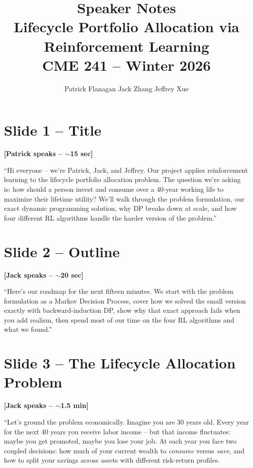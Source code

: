 \documentclass[11pt, letterpaper]{article}
\title{\textbf{Speaker Notes}\\[0.3em]
\large Lifecycle Portfolio Allocation via Reinforcement Learning\\
CME 241 -- Winter 2026}
\author{Patrick Flanagan \quad Jack Zhang \quad Jeffrey Xue}
\date{}
\begin{document}
\maketitle
\tableofcontents
\newpage

\section{Slide 1 -- Title}

\textbf{[Patrick speaks -- $\sim$15 sec]}

``Hi everyone -- we're Patrick, Jack, and Jeffrey. Our project applies reinforcement learning to the lifecycle portfolio allocation problem. The question we're asking is: how should a person invest and consume over a 40-year working life to maximize their lifetime utility? We'll walk through the problem formulation, our exact dynamic programming solution, why DP breaks down at scale, and how four different RL algorithms handle the harder version of the problem.''

\section{Slide 2 -- Outline}

\textbf{[Jack speaks -- $\sim$20 sec]}

``Here's our roadmap for the next fifteen minutes. We start with the problem formulation as a Markov Decision Process, cover how we solved the small version exactly with backward-induction DP, show why that exact approach fails when you add realism, then spend most of our time on the four RL algorithms and what we found.''

\section{Slide 3 -- The Lifecycle Allocation Problem}

\textbf{[Jack speaks -- $\sim$1.5 min]}

``Let's ground the problem economically. Imagine you are 30 years old. Every year for the next 40 years you receive labor income -- but that income fluctuates: maybe you get promoted, maybe you lose your job. At each year you face two coupled decisions: how much of your current wealth to \emph{consume} versus \emph{save}, and how to split your savings across assets with different risk-return profiles.
\end{document}
